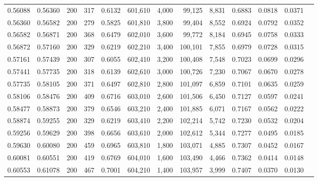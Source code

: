 \begin{tabular}{rrrrrrrrrrrrr}
0.56088 & 0.56360 &    200 & 317 &                                     0.6132 & 601,610 &   4,000 &  99,125 &   8,831 & 0.6883 & 0.0818 & 0.0371 \\
0.56360 & 0.56582 &    200 & 279 &                                     0.5825 & 601,810 &   3,800 &  99,404 &   8,552 & 0.6924 & 0.0792 & 0.0352 \\
0.56582 & 0.56871 &    200 & 368 &                                     0.6479 & 602,010 &   3,600 &  99,772 &   8,184 & 0.6945 & 0.0758 & 0.0333 \\
0.56872 & 0.57160 &    200 & 329 &                                     0.6219 & 602,210 &   3,400 & 100,101 &   7,855 & 0.6979 & 0.0728 & 0.0315 \\
0.57161 & 0.57439 &    200 & 307 &                                     0.6055 & 602,410 &   3,200 & 100,408 &   7,548 & 0.7023 & 0.0699 & 0.0296 \\
0.57441 & 0.57735 &    200 & 318 &                                     0.6139 & 602,610 &   3,000 & 100,726 &   7,230 & 0.7067 & 0.0670 & 0.0278 \\
0.57735 & 0.58105 &    200 & 371 &                                     0.6497 & 602,810 &   2,800 & 101,097 &   6,859 & 0.7101 & 0.0635 & 0.0259 \\
0.58106 & 0.58476 &    200 & 409 &                                     0.6716 & 603,010 &   2,600 & 101,506 &   6,450 & 0.7127 & 0.0597 & 0.0241 \\
0.58477 & 0.58873 &    200 & 379 &                                     0.6546 & 603,210 &   2,400 & 101,885 &   6,071 & 0.7167 & 0.0562 & 0.0222 \\
0.58874 & 0.59255 &    200 & 329 &                                     0.6219 & 603,410 &   2,200 & 102,214 &   5,742 & 0.7230 & 0.0532 & 0.0204 \\
0.59256 & 0.59629 &    200 & 398 &                                     0.6656 & 603,610 &   2,000 & 102,612 &   5,344 & 0.7277 & 0.0495 & 0.0185 \\
0.59630 & 0.60080 &    200 & 459 &                                     0.6965 & 603,810 &   1,800 & 103,071 &   4,885 & 0.7307 & 0.0452 & 0.0167 \\
0.60081 & 0.60551 &    200 & 419 &                                     0.6769 & 604,010 &   1,600 & 103,490 &   4,466 & 0.7362 & 0.0414 & 0.0148 \\
0.60553 & 0.61078 &    200 & 467 &                                     0.7001 & 604,210 &   1,400 & 103,957 &   3,999 & 0.7407 & 0.0370 & 0.0130 \\

\end{tabular}
